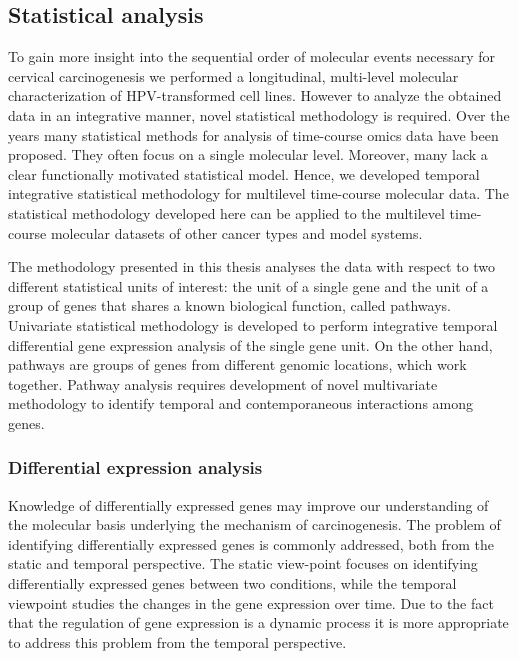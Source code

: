 \subsection{Statistical analysis}

To gain more insight into the sequential order of molecular events necessary for cervical carcinogenesis we performed a longitudinal, multi-level molecular characterization of HPV-transformed cell lines. 
However to analyze the obtained data in an integrative manner, novel statistical methodology is required. Over the years many statistical methods for analysis of time-course omics data have been proposed. They often focus on a single molecular level. Moreover, many lack a clear functionally motivated statistical model. Hence, we developed temporal integrative statistical methodology for multilevel time-course molecular data. The statistical methodology developed here can be applied to the multilevel time-course molecular datasets of other cancer types and model systems. 

The methodology presented in this thesis analyses the data with respect to two different statistical units of interest: the unit of a single gene and the unit of a group of genes that shares a known biological function, called pathways. Univariate statistical methodology is developed to perform integrative temporal differential gene expression analysis of the single gene unit. On the other hand, pathways are groups of genes from different genomic locations, which work together. Pathway analysis requires development of novel multivariate methodology to identify temporal and contemporaneous interactions among genes.

\subsubsection{Differential expression analysis}

Knowledge of differentially expressed genes may improve our understanding of the molecular basis underlying the mechanism of carcinogenesis. The problem of identifying differentially expressed genes is commonly addressed, both from the static and temporal perspective. The static view-point focuses on identifying differentially expressed genes between two conditions, while the temporal viewpoint studies the changes in the gene expression over time. Due to the fact that the regulation of gene expression is a dynamic process it is more appropriate to address this problem from the temporal perspective.

